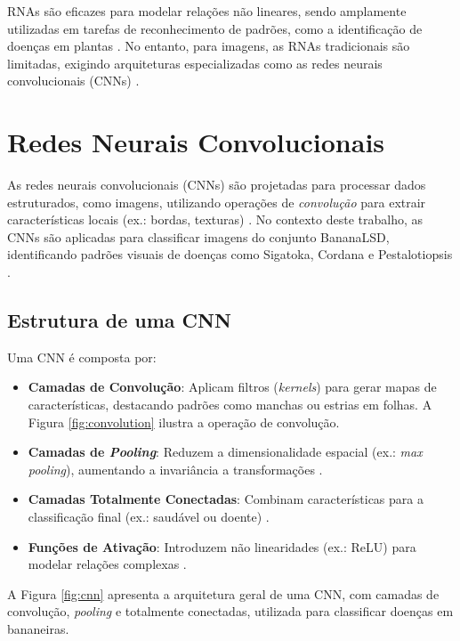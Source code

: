 RNAs são eficazes para modelar relações não lineares, sendo amplamente utilizadas em tarefas de reconhecimento de padrões, como a identificação de doenças em plantas \cite{Goodfellow2016}. No entanto, para imagens, as RNAs tradicionais são limitadas, exigindo arquiteturas especializadas como as redes neurais convolucionais (CNNs) \cite{leite2022}.

\section{Redes Neurais Convolucionais}
\label{sec:cnns}

As redes neurais convolucionais (CNNs) são projetadas para processar dados estruturados, como imagens, utilizando operações de \textit{convolução} para extrair características locais (ex.: bordas, texturas) \cite{LeCun1998}. No contexto deste trabalho, as CNNs são aplicadas para classificar imagens do conjunto BananaLSD, identificando padrões visuais de doenças como Sigatoka, Cordana e Pestalotiopsis \cite{DadosArt}.

\subsection{Estrutura de uma CNN}
\label{subsec:estrutura-cnn}

Uma CNN é composta por:

\begin{itemize}
    \item \textbf{Camadas de Convolução}: Aplicam filtros (\textit{kernels}) para gerar mapas de características, destacando padrões como manchas ou estrias em folhas. A Figura \ref{fig:convolution} ilustra a operação de convolução.
    \item \textbf{Camadas de \textit{Pooling}}: Reduzem a dimensionalidade espacial (ex.: \textit{max pooling}), aumentando a invariância a transformações \cite{Goodfellow2016}.
    \item \textbf{Camadas Totalmente Conectadas}: Combinam características para a classificação final (ex.: saudável ou doente) \cite{RezendeTese}.
    \item \textbf{Funções de Ativação}: Introduzem não linearidades (ex.: ReLU) para modelar relações complexas \cite{Krizhevsky2012}.
\end{itemize}



A Figura \ref{fig:cnn} apresenta a arquitetura geral de uma CNN, com camadas de convolução, \textit{pooling} e totalmente conectadas, utilizada para classificar doenças em bananeiras.

